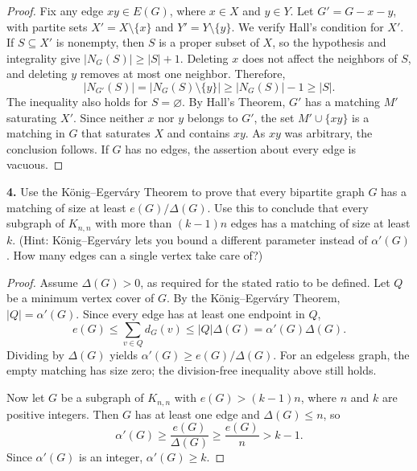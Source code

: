 \documentclass[12pt]{amsart}
\theoremstyle{conjecture}
\theoremstyle{definition}
\theoremstyle{question}
\theoremstyle{theorem}
\begin{document}
    \begin{proof}
    Fix any edge \(xy\in E(G)\), where \(x\in X\) and \(y\in Y\).
    Let \(G'=G-x-y\), with partite sets \(X'=X\setminus\{x\}\)
    and \(Y'=Y\setminus\{y\}\). We verify Hall's condition for \(X'\).
    If \(S\subseteq X'\) is nonempty, then \(S\) is a proper subset
    of \(X\), so the hypothesis and integrality give
    \(|N_G(S)|\geq |S|+1\). Deleting \(x\) does not affect the
    neighbors of \(S\), and deleting \(y\) removes at most one neighbor.
    Therefore,
    \[
        |N_{G'}(S)|=|N_G(S)\setminus\{y\}|
        \geq |N_G(S)|-1\geq |S|.
    \]
    The inequality also holds for \(S=\varnothing\). By Hall's Theorem,
    \(G'\) has a matching \(M'\) saturating \(X'\). Since neither
    \(x\) nor \(y\) belongs to \(G'\), the set \(M'\cup\{xy\}\)
    is a matching in \(G\) that saturates \(X\) and contains \(xy\).
    As \(xy\) was arbitrary, the conclusion follows. If \(G\) has
    no edges, the assertion about every edge is vacuous.
    \end{proof}

    \noindent\textbf{4.} Use the K\"onig--Egerv\'ary Theorem to prove that every bipartite
    graph \(G\) has a matching of size at least \(e(G)/\Delta(G)\).
    Use this to conclude that every subgraph of \(K_{n,n}\) with more
    than \((k-1)n\) edges has a matching of size at least \(k\).
    (Hint: K\"onig--Egerv\'ary lets you bound a different parameter
    instead of \(\alpha'(G)\). How many edges can a single vertex
    take care of?)

    \begin{proof}
    Assume \(\Delta(G)>0\), as required for the stated ratio to be
    defined. Let \(Q\) be a minimum vertex cover of \(G\). By the
    K\"onig--Egerv\'ary Theorem, \(|Q|=\alpha'(G)\). Since every
    edge has at least one endpoint in \(Q\),
    \[
        e(G)\leq \sum_{v\in Q}d_G(v)
        \leq |Q|\Delta(G)=\alpha'(G)\Delta(G).
    \]
    Dividing by \(\Delta(G)\) yields
    \(\alpha'(G)\geq e(G)/\Delta(G)\).
    For an edgeless graph, the empty matching has size zero; the
    division-free inequality above still holds.

    Now let \(G\) be a subgraph of \(K_{n,n}\) with
    \(e(G)>(k-1)n\), where \(n\) and \(k\) are positive integers.
    Then \(G\) has at least one edge and \(\Delta(G)\leq n\), so
    \[
        \alpha'(G)\geq \frac{e(G)}{\Delta(G)}
        \geq \frac{e(G)}{n}>k-1.
    \]
    Since \(\alpha'(G)\) is an integer, \(\alpha'(G)\geq k\).
    \end{proof}
\end{document}
